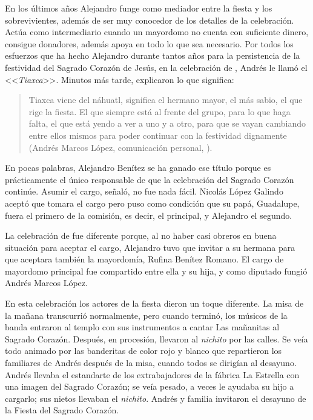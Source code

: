 \documentclass[14pt,letterpaper,twoside]{extbook} %
\begin{document}
\noindent En los últimos años Alejandro funge como mediador entre la fiesta y los sobrevivientes, además de ser muy conocedor de los detalles de la celebración. Actúa como intermediario cuando un mayordomo no cuenta con suficiente dinero, consigue donadores, además apoya en todo lo que sea necesario. Por todos los esfuerzos que ha hecho Alejandro durante tantos años para la persistencia de la festividad del Sagrado Corazón de Jesús, en la celebración de , Andrés le llamó el <<\textit{Tiaxca}>>. Minutos más tarde, explicaron lo que significa:

\begin{quotation}
\noindent Tiaxca viene del náhuatl, significa el hermano mayor, el más sabio, el que rige la fiesta. El que siempre está al frente del grupo, para lo que haga falta, el que está yendo a ver a uno y a otro, para que se vayan cambiando entre ellos mismos para poder continuar con la festividad dignamente (Andrés Marcos López, comunicación personal, ).
\end{quotation}

\noindent En pocas palabras, Alejandro Benítez se ha ganado ese título porque es prácticamente el único responsable de que la celebración del Sagrado Corazón continúe. Asumir el cargo, señaló, no fue nada fácil. Nicolás López Galindo aceptó que tomara el cargo pero puso como condición que su papá, Guadalupe, fuera el primero de la comisión, es decir, el principal, y Alejandro el segundo.

La celebración de  fue diferente porque, al no haber casi obreros en buena situación para aceptar el cargo, Alejandro tuvo que invitar a su hermana para que aceptara también la mayordomía, Rufina Benítez Romano. El cargo de mayordomo principal fue compartido entre ella y su hija, y como diputado fungió Andrés Marcos López.

En esta celebración los actores de la fiesta dieron un toque diferente. La misa de la mañana transcurrió normalmente, pero cuando terminó, los músicos de la banda entraron al templo con sus instrumentos a cantar Las mañanitas al Sagrado Corazón. Después, en procesión, llevaron al \textit{nichito} por las calles. Se veía todo animado por las banderitas de color rojo y blanco que repartieron los familiares de Andrés después de la misa, cuando todos se dirigían al desayuno. Andrés llevaba el estandarte de los extrabajadores de la fábrica La Estrella con una
imagen del Sagrado Corazón; se veía pesado, a veces le ayudaba su hijo a cargarlo; sus nietos llevaban el \textit{nichito}. Andrés y familia invitaron el desayuno de la Fiesta del Sagrado Corazón.
\end{document}
